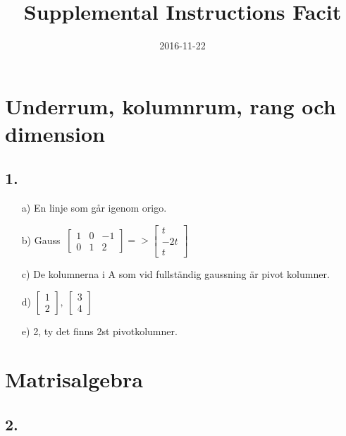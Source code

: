 \documentclass{article}
\title{Supplemental Instructions Facit}
\date{
      2016-11-22
     }
\begin{document}
\maketitle

\section*{Underrum, kolumnrum, rang och dimension}
\subsection*{1.}
\begin{itemize}
	\item[a) ] En linje som går igenom origo.
	\item[b) ] Gauss $~ \begin{bmatrix} 1&0 &-1 \\ 0& 1& 2 \end{bmatrix} => \begin{bmatrix}t \\-2t \\ t\end{bmatrix}$
	\item[c) ] De kolumnerna i A som vid fullständig gaussning är pivot kolumner.
	\item[d) ] $\begin{bmatrix}1 \\2 \end{bmatrix},\ \begin{bmatrix} 3\\ 4\end{bmatrix}$
	\item[e) ] 2, ty det finns 2st pivotkolumner.
\end{itemize}

\section*{Matrisalgebra}
\subsection*{2.}
\end{document}
